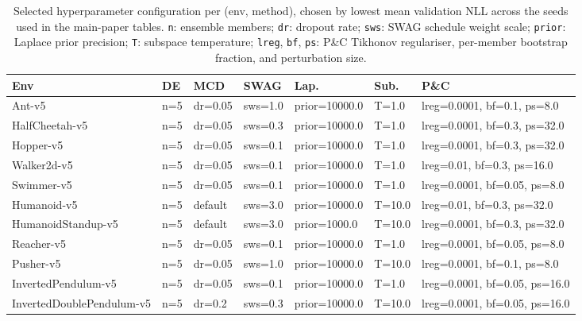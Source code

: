 \begin{table}[t]
  \centering
  \scriptsize
  \caption{Selected hyperparameter configuration per (env, method), chosen by lowest mean validation NLL across the seeds used in the main-paper tables. \texttt{n}: ensemble members; \texttt{dr}: dropout rate; \texttt{sws}: SWAG schedule weight scale; \texttt{prior}: Laplace prior precision; \texttt{T}: subspace temperature; \texttt{lreg}, \texttt{bf}, \texttt{ps}: P\&C Tikhonov regulariser, per-member bootstrap fraction, and perturbation size.}
  \label{tab:appendix-selected-hparams}
  \begin{tabular}{lllllll}
    \toprule
    Env & DE & MCD & SWAG & Lap. & Sub. & P\&C \\
    \midrule
    Ant-v5 & n=5 & dr=0.05 & sws=1.0 & prior=10000.0 & T=1.0 & lreg=0.0001, bf=0.1, ps=8.0 \\
    HalfCheetah-v5 & n=5 & dr=0.05 & sws=0.3 & prior=10000.0 & T=1.0 & lreg=0.0001, bf=0.3, ps=32.0 \\
    Hopper-v5 & n=5 & dr=0.05 & sws=0.1 & prior=10000.0 & T=1.0 & lreg=0.0001, bf=0.3, ps=32.0 \\
    Walker2d-v5 & n=5 & dr=0.05 & sws=0.1 & prior=10000.0 & T=1.0 & lreg=0.01, bf=0.3, ps=16.0 \\
    Swimmer-v5 & n=5 & dr=0.05 & sws=0.1 & prior=10000.0 & T=1.0 & lreg=0.0001, bf=0.05, ps=8.0 \\
    Humanoid-v5 & n=5 & default & sws=3.0 & prior=10000.0 & T=10.0 & lreg=0.01, bf=0.3, ps=32.0 \\
    HumanoidStandup-v5 & n=5 & default & sws=3.0 & prior=1000.0 & T=10.0 & lreg=0.0001, bf=0.3, ps=32.0 \\
    Reacher-v5 & n=5 & dr=0.05 & sws=0.1 & prior=10000.0 & T=1.0 & lreg=0.0001, bf=0.05, ps=8.0 \\
    Pusher-v5 & n=5 & dr=0.05 & sws=1.0 & prior=10000.0 & T=10.0 & lreg=0.0001, bf=0.1, ps=8.0 \\
    InvertedPendulum-v5 & n=5 & dr=0.05 & sws=0.1 & prior=10000.0 & T=1.0 & lreg=0.0001, bf=0.05, ps=16.0 \\
    InvertedDoublePendulum-v5 & n=5 & dr=0.2 & sws=0.3 & prior=10000.0 & T=10.0 & lreg=0.0001, bf=0.05, ps=16.0 \\
    \bottomrule
  \end{tabular}
\end{table}

